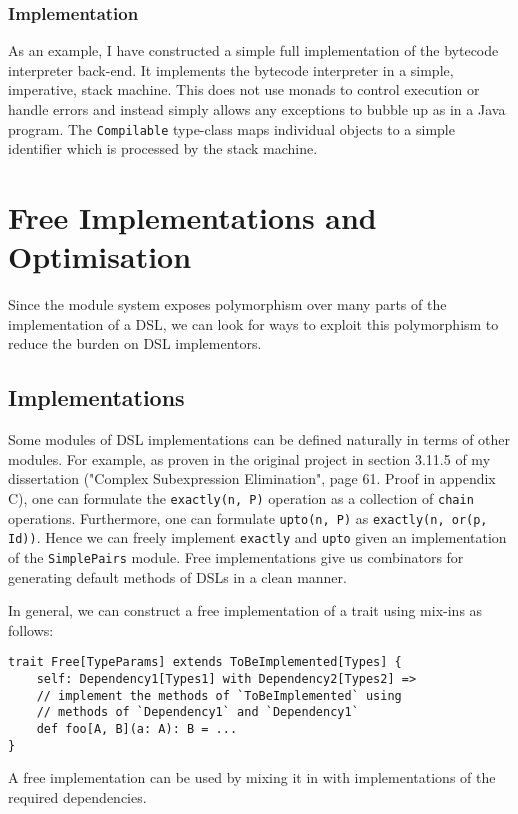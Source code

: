 \documentclass{report}
\newcommand \2[0]{\textbf{2}}
\newcommand \3[0]{\textbf{3}}
\begin{document}
\subsection{Implementation}
As an example, I have constructed a simple full implementation of the bytecode interpreter back-end. It implements the bytecode interpreter in a simple, imperative, stack machine. This does not use monads to control execution or handle errors and instead simply allows any exceptions to bubble up as in a Java program. The \texttt{Compilable} type-class maps individual objects to a simple identifier which is processed by the stack machine.

\chapter{Free Implementations and Optimisation}
Since the module system exposes polymorphism over many parts of the implementation of a DSL, we can look for ways to exploit this polymorphism to reduce the burden on DSL implementors.

\section{Implementations}
Some modules of DSL implementations can be defined naturally in terms of other modules. For example, as proven in the original project in section 3.11.5 of my dissertation ("Complex Subexpression Elimination", page 61. Proof in appendix C), one can formulate the \texttt{exactly(n, P)} operation as a collection of \texttt{chain} operations. Furthermore, one can formulate \texttt{upto(n, P)} as \texttt{exactly(n, or(p, Id))}. Hence we can freely implement \texttt{exactly} and \texttt{upto} given an implementation of the \texttt{SimplePairs} module. Free implementations give us combinators for generating default methods of DSLs in a clean manner.

In general, we can construct a free implementation of a trait using mix-ins as follows:

\begin{verbatim}
trait Free[TypeParams] extends ToBeImplemented[Types] {
    self: Dependency1[Types1] with Dependency2[Types2] =>
    // implement the methods of `ToBeImplemented` using 
    // methods of `Dependency1` and `Dependency1`
    def foo[A, B](a: A): B = ...
}
\end{verbatim}

A free implementation can be used by mixing it in with implementations of the required dependencies.
\end{document}
